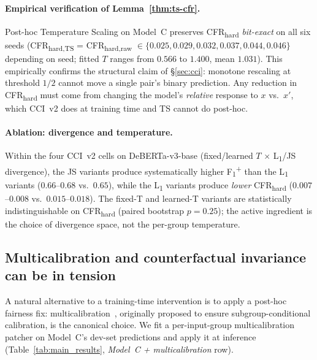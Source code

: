 \paragraph{Empirical verification of Lemma~\ref{thm:ts-cfr}.}
Post-hoc Temperature Scaling on Model~C preserves CFR\textsubscript{hard} \emph{bit-exact} on all six seeds (CFR\textsubscript{hard,TS} = CFR\textsubscript{hard,raw} $\in \{0.025, 0.029, 0.032, 0.037, 0.044, 0.046\}$ depending on seed; fitted $T$ ranges from $0.566$ to $1.400$, mean $1.031$). This empirically confirms the structural claim of \S\ref{sec:cci}: monotone rescaling at threshold $1/2$ cannot move a single pair's binary prediction. Any reduction in CFR\textsubscript{hard} must come from changing the model's \emph{relative} response to $x$ vs.\ $x'$, which CCI~v2 does at training time and TS cannot do post-hoc.

\paragraph{Ablation: divergence and temperature.}
Within the four CCI~v2 cells on DeBERTa-v3-base (fixed/learned $T$ $\times$ L\textsubscript{1}/JS divergence), the JS variants produce systematically higher F\textsubscript{1}\textsuperscript{+} than the L\textsubscript{1} variants ($0.66$--$0.68$ vs.\ $0.65$), while the L\textsubscript{1} variants produce \emph{lower} CFR\textsubscript{hard} ($0.007$--$0.008$ vs.\ $0.015$--$0.018$). The fixed-T and learned-T variants are statistically indistinguishable on CFR\textsubscript{hard} (paired bootstrap $p = 0.25$); the active ingredient is the choice of divergence space, not the per-group temperature.

\subsection{Multicalibration and counterfactual invariance can be in tension}
\label{sec:multicalibration_tension}

A natural alternative to a training-time intervention is to apply a post-hoc fairness fix: multicalibration~\citep{hebertjohnson2018multicalibration}, originally proposed to ensure subgroup-conditional calibration, is the canonical choice. We fit a per-input-group multicalibration patcher on Model~C's dev-set predictions and apply it at inference (Table~\ref{tab:main_results}, \emph{Model~C + multicalibration} row).

